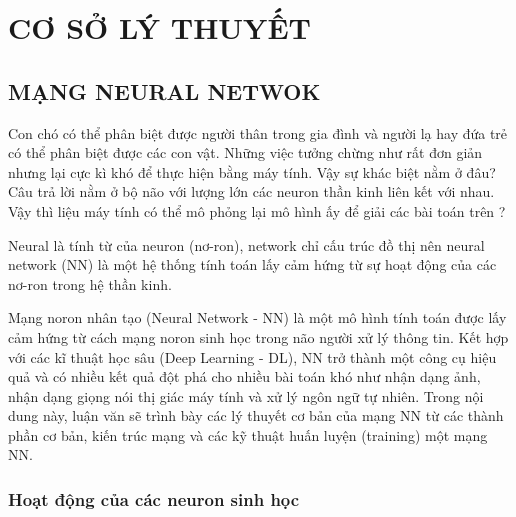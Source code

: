 \chapter{CƠ SỞ LÝ THUYẾT}
\label{c:co_so_ly_thuyet}


\section{MẠNG NEURAL NETWOK}

				
				
Con chó có thể phân biệt được người thân trong gia đình và người lạ hay đứa trẻ có thể phân biệt được các con vật. Những việc tưởng chừng như rất đơn giản nhưng lại cực kì khó để thực hiện bằng máy tính. Vậy sự khác biệt nằm ở đâu? Câu trả lời nằm ở bộ não với lượng lớn các neuron thần kinh liên kết với nhau. Vậy thì liệu máy tính có thể mô phỏng lại mô hình ấy để giải các bài toán trên ?

Neural là tính từ của neuron (nơ-ron), network chỉ cấu trúc đồ thị nên neural network (NN) là một hệ thống tính toán lấy cảm hứng từ sự hoạt động của các nơ-ron trong hệ thần kinh.

Mạng noron nhân tạo (Neural Network - NN) là một mô hình tính toán được lấy cảm hứng từ cách mạng noron sinh học trong não người xử lý thông tin. Kết hợp với các kĩ thuật học sâu (Deep Learning - DL), NN  trở thành một công cụ hiệu quả và có nhiều kết quả đột phá cho nhiều bài toán khó như nhận dạng ảnh, nhận dạng giọng nói thị giác máy tính và xử lý ngôn ngữ tự nhiên. Trong nội dung này, luận văn sẽ trình bày các lý thuyết cơ bản của mạng NN từ các thành phần cơ bản, kiến trúc mạng và các kỹ thuật huấn luyện (training) một mạng NN.

\subsection{Hoạt động của các neuron sinh học}

